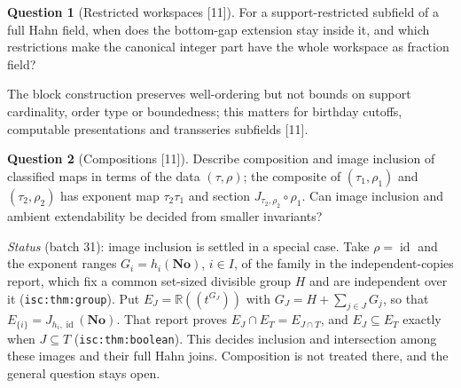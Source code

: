 \documentclass[11pt,oneside]{article}
\numberwithin{equation}{section}
\theoremstyle{definition}
\newtheorem{question}[question]{Question}
\theoremstyle{remark}
\newcommand{\No}{\mathbf{No}}
\newcommand{\R}{\mathbb R}
\newcommand{\id}{\operatorname{id}}
\newcommand{\Hahn}[2]{#1((t^{#2}))}
\newcommand{\src}[1]{\textup{\textsf{\small[#1]}}}
\newcommand{\lbl}[1]{\nolinkurl{#1}}
\begin{document}
\begin{question}[Restricted workspaces \src{11}]\label{opa:as:q:workspaces}
For a support-restricted subfield of a full Hahn field, when does the bottom-gap extension stay inside it, and which
restrictions make the canonical integer part have the whole workspace as fraction field?
\end{question}
The block construction preserves well-ordering but not bounds on support cardinality, order type or boundedness; this
matters for birthday cutoffs, computable presentations and transseries subfields \src{11}.

\begin{question}[Compositions \src{11}]\label{opa:as:q:composition}
Describe composition and image inclusion of classified maps in terms of the data $(\tau,\rho)$; the composite of
$(\tau_1,\rho_1)$ and $(\tau_2,\rho_2)$ has exponent map $\tau_2\tau_1$ and section $J_{\tau_2,\rho_2}\circ\rho_1$. Can
image inclusion and ambient extendability be decided from smaller invariants?
\end{question}
\emph{Status} (batch 31): image inclusion is settled in a special case. Take $\rho=\id$ and the exponent ranges
$G_i=h_i(\No)$, $i\in I$, of the family in the independent-copies report, which fix a common set-sized divisible
group $H$ and are independent over it (\lbl{isc:thm:group}). Put $E_J=\Hahn\R{G_J}$ with $G_J=H+\sum_{j\in J}G_j$, so
that $E_{\{i\}}=J_{h_i,\id}(\No)$. That report proves $E_J\cap E_T=E_{J\cap T}$, and $E_J\subseteq E_T$ exactly when
$J\subseteq T$ (\lbl{isc:thm:boolean}). This decides inclusion and intersection among these images and their full
Hahn joins. Composition is not treated there, and the general question stays open.
\end{document}
